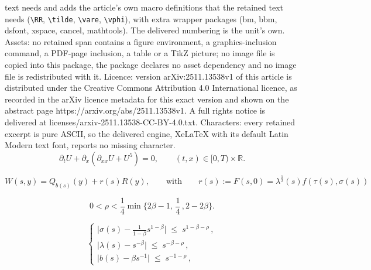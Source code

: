 \documentclass[10pt,a4paper]{amsart}
\newcommand{\RR}{\mathbb{R}}
\begin{document}
text needs and adds the article's own macro definitions that the retained text needs (\texttt{\textbackslash RR}, \texttt{\textbackslash tilde}, \texttt{\textbackslash vare}, \texttt{\textbackslash vphi}), with extra wrapper packages (bm, bbm, dsfont, xspace, cancel, mathtools). The delivered numbering is the unit's own. Assets: no retained span contains a figure environment, a graphics-inclusion command, a PDF-page inclusion, a table or a TikZ picture; no image file is copied into this package, the package declares no asset dependency and no image file is redistributed with it. Licence: version arXiv:2511.13538v1 of this article is distributed under the Creative Commons Attribution 4.0 International licence, as recorded in the arXiv licence metadata for this exact version and shown on the abstract page https://arxiv.org/abs/2511.13538v1. A full rights notice is delivered at licenses/arxiv-2511.13538-CC-BY-4.0.txt. Characters: every retained excerpt is pure ASCII, so the delivered engine, XeLaTeX with its default Latin Modern text font, reports no missing character.
\begin{equation}\label{gKdV_principal_eq}
    \partial_t U + \partial_x(\partial_{xx}U + U^5)=0, \qquad (t,x)\in [0,T) \times\RR.
\end{equation}

\begin{equation}\label{def_of_W_and_of_r}
    W(s,y) = Q_{b(s)}(y)+r(s)R(y), \qquad \text{with} \qquad r(s):=F(s,0)= \lambda^{\frac{1}{2}}(s)f(\tau(s),\sigma(s))
\end{equation}

\begin{equation}\label{condition_on_rho}
0<\rho < \frac{1}{4} \min{\{ 2\beta-1,\, \frac{1}{4}\, ,2-2\beta \}}.
\end{equation}%

\begin{equation}\tag{BS1}\label{BS1}
    \begin{cases}
        \lvert \sigma(s) - \frac{1}{1-\beta} s^{1-\beta}\rvert \;\leq\; s^{1-\beta-\rho} \,, \\
        \lvert \lambda(s) - s^{-\beta} \rvert \;\leq\; s^{-\beta-\rho} \,,\\
        \lvert b(s) - \beta s^{-1} \rvert \;\leq\; s^{-1-\rho} \,,
    \end{cases}
\end{equation}
\end{document}
